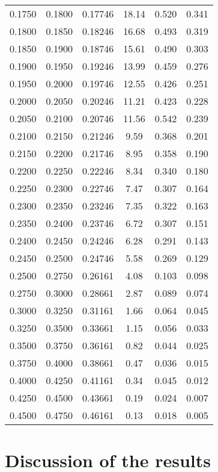 \documentclass[TOTEM]{cernphprep}
\begin{document}
\begin{table*}
\begin{center}
\begin{tabular}{ | c  c  c | c  c  c|}
0.1750	&	0.1800	&	0.17746	&	18.14	&	0.520	&	0.341	\\
0.1800	&	0.1850	&	0.18246	&	16.68	&	0.493	&	0.319	\\
0.1850	&	0.1900	&	0.18746	&	15.61	&	0.490	&	0.303	\\
0.1900	&	0.1950	&	0.19246	&	13.99	&	0.459	&	0.276	\\
0.1950	&	0.2000	&	0.19746	&	12.55	&	0.426	&	0.251	\\
0.2000	&	0.2050	&	0.20246	&	11.21	&	0.423	&	0.228	\\
0.2050	&	0.2100	&	0.20746	&	11.56	&	0.542	&	0.239	\\
0.2100	&	0.2150	&	0.21246	&	9.59	&	0.368	&	0.201	\\
0.2150	&	0.2200	&	0.21746	&	8.95	&	0.358	&	0.190	\\
0.2200	&	0.2250	&	0.22246	&	8.34	&	0.340	&	0.180	\\
0.2250	&	0.2300	&	0.22746	&	7.47	&	0.307	&	0.164	\\
0.2300	&	0.2350	&	0.23246	&	7.35	&	0.322	&	0.163	\\
0.2350	&	0.2400	&	0.23746	&	6.72	&	0.307	&	0.151	\\
0.2400	&	0.2450	&	0.24246	&	6.28	&	0.291	&	0.143	\\
0.2450	&	0.2500	&	0.24746	&	5.58	&	0.269	&	0.129	\\
0.2500	&	0.2750	&	0.26161	&	4.08	&	0.103	&	0.098	\\
0.2750	&	0.3000	&	0.28661	&	2.87	&	0.089	&	0.074	\\
0.3000	&	0.3250	&	0.31161	&	1.66	&	0.064	&	0.045	\\
0.3250	&	0.3500	&	0.33661	&	1.15	&	0.056	&	0.033	\\
0.3500	&	0.3750	&	0.36161	&	0.82	&	0.044	&	0.025	\\
0.3750	&	0.4000	&	0.38661	&	0.47	&	0.036	&	0.015	\\
0.4000	&	0.4250	&	0.41161	&	0.34	&	0.045	&	0.012	\\
0.4250	&	0.4500	&	0.43661	&	0.19	&	0.024	&	0.007	\\
0.4500	&	0.4750	&	0.46161	&	0.13	&	0.018	&	0.005	\\ \hline
            \end{tabular}
        \label{DS2_data}
        \end{center}
    \end{table*}

\section{Discussion of the results}
\label{discussion_of_physics_results}
\end{document}
